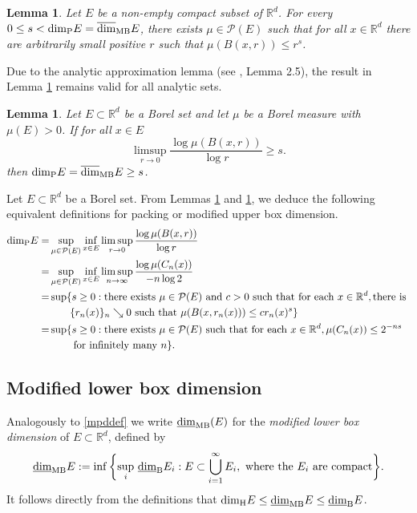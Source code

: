 \documentclass[12pt]{article}
\newcommand{\1}{{\bf 1}}
\newcommand\lbd{\underline{\mbox{\rm dim}}_{\rm B}} %
\newcommand\pkd{\mbox{\rm dim}_{\rm P}} %
\newcommand\hdd{\mbox{\rm dim}_{\rm H}} %
\newcommand\mlbd{\underline{\mbox{\rm dim}}_{\rm MB}} %
\newcommand\mubd{\overline{\mbox{\rm dim}}_{\rm MB}} %
\newcommand{\R}{\mathbb{R}}
\newtheorem{lem}[theo]{Lemma}
\begin{document}
\begin{lem} {\rm \cite[Lemma 3.4]{Cu}}\label{frostman-packing}
	Let $E$ be a non-empty compact subset of $\R^d$. For every $0\leq s<\pkd E=\mubd E$, there exists $\mu\in\mathcal{P}(E)$  such that for all $x\in\R^d$ there are arbitrarily small  positive $r$ such that $\mu(B(x,r)) \leq r^{s}$. 	
\end{lem}
 Due to the analytic approximation lemma  (see \cite{Cu}, Lemma 2.5),  the result in Lemma \ref{frostman-packing} remains valid for all analytic sets.

\begin{lem} {\rm\cite{Cu,Fa3}}\label{re-packing-upper-local-dimension}
	Let $E\subset \R^d$ be a Borel set and let $\mu$ be a Borel measure with
	 $\mu(E)>0$. If for all $x\in E$
		\begin{equation*}
		\limsup_{r\to 0}\frac{\log\mu(B(x,r))}{\log r}\geq s.
	\end{equation*}
	then $\pkd E=\mubd E \geq s$. 
\end{lem}

	Let $E\subset \R^d$ be a Borel set.
From Lemmas \ref{frostman-packing} and \ref{re-packing-upper-local-dimension}, we deduce the following equivalent definitions for  packing or modified upper box dimension.
	\begin{align}\label{packingdimension}
	\pkd  E =&\sup_{\mu\in\mathcal{P}(E)}\inf_{x\in E}\limsup_{r\to 0}\frac{\log\mu(B(x,r))}{\log r}\notag\\	
	=&\sup_{\mu\in\mathcal{P}(E)}\inf_{x\in E}\limsup_{n\to \infty}\frac{\log\mu(C_n(x))}{-n\log 2}\notag\\
	=&\sup\{s\geq0:\text{there exists }\mu\in\mathcal{P}(E)\text{ and } c>0 \text{ such that for each }x\in\R^d, \text{there is }\notag\\
	&\qquad  \{r_n(x)\}_n\searrow0 \text{ such that } \mu(B(x,r_n(x)))\leq cr_n(x)^{s}\}\\	
	=&\sup\{s\geq0: \text{there exists }\mu\in\mathcal{P}(E)  \text{ such that for each }x\in\R^d, \mu(C_{n}(x))\leq  2^{-ns}\notag\\ 
	&\qquad 	\text{ for infinitely many } n\}.\notag
	\end{align}


\subsection{Modified lower box dimension}

Analogously to \eqref{mpddef} we write $\mlbd(E)$ for the {\it modified lower box dimension} of $E \subset  \mathbb{R}^d$, defined by 
$$\mlbd E:= \inf\bigg\{ {\sup_i }  \  \lbd E_i: E\subset \bigcup_{i=1}^\infty E_i, \text{ where the } E_i \text{ are compact} \bigg\}.$$
It follows directly from the definitions that 
$\hdd E\leq \mlbd E\leq \lbd E$.
\end{document}
